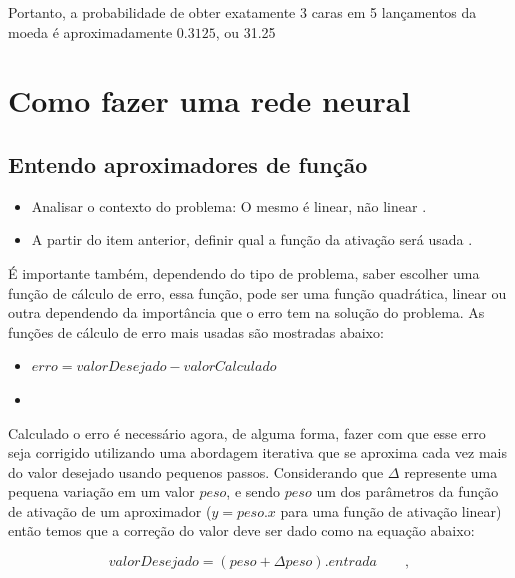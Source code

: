 \begin{apendicesenv}
	\par Portanto, a probabilidade de obter exatamente 3 caras em 5 lançamentos da moeda é aproximadamente $ 0.3125 $, ou 31.25%
	
	\chapter{Como fazer uma rede neural}
	
	\section{Entendo aproximadores de função}
		\begin{itemize}
			\item Analisar o contexto do problema: O mesmo é linear, não linear \cite{rashid2016make}.
			\item A partir do item anterior, definir qual a função da ativação será usada \cite{rashid2016make}.
		\end{itemize}
	
		\par É importante também, dependendo do tipo de problema, saber escolher uma função de cálculo de erro, essa função, pode ser uma função quadrática, linear ou outra dependendo da importância que o erro tem na solução do problema. As funções de cálculo de erro mais usadas são mostradas abaixo:
		
		\begin{itemize}
			\item $erro = valorDesejado - valorCalculado$
			\item 
		\end{itemize}
	
		\par Calculado o erro é necessário agora, de alguma forma, fazer com que esse erro seja corrigido utilizando uma abordagem iterativa que se aproxima cada vez mais do valor desejado usando pequenos passos. Considerando que $\Delta$ represente uma pequena variação em um valor $peso$, e sendo  $peso$ um dos parâmetros da função de ativação de um aproximador ($y = peso . x$ para uma função de ativação linear) então temos que a correção do valor deve ser dado como na equação abaixo:
		
		\begin{equation}
			valorDesejado = (peso + \Delta peso) . entrada \qquad,
		\end{equation}
		\cite{rashid2016make}
		

\end{apendicesenv}
